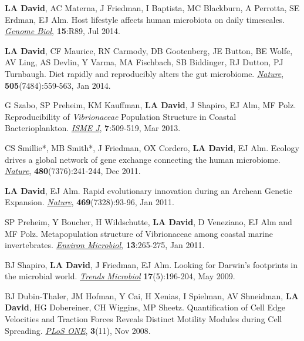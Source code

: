 \documentclass[overlapped,line,11pt]{res}
\begin{document}
\begin{resume}
\begin{revnumerate}[26]
\item {\textbf{LA David}, AC Materna, J Friedman, I Baptista, MC
  Blackburn, A Perrotta, SE Erdman, EJ Alm.  Host lifestyle affects
  human microbiota on daily timescales.
  \emph{\underline{Genome Biol}}, \textbf{15}:R89, Jul 2014.}

\item {\textbf{LA David}, CF Maurice, RN Carmody, DB Gootenberg, JE
  Button, BE Wolfe, AV Ling, AS Devlin, Y Varma, MA Fischbach, SB
  Biddinger, RJ Dutton, PJ Turnbaugh.  Diet rapidly and reproducibly
  alters the gut microbiome. \emph{\underline{Nature}},
  \textbf{505}(7484):559-563, Jan 2014.}

\item {G Szabo, SP Preheim, KM Kauffman, \textbf{LA David}, J Shapiro,
  EJ Alm, MF Polz.  Reproducibility of \emph{Vibrionaceae} Population
  Structure in Coastal Bacterioplankton. \emph{\underline{ISME J}},
  \textbf{7}:509-519, Mar 2013.}

\item {CS Smillie*, MB Smith*, J Friedman, OX Cordero, \textbf{LA
    David}, EJ Alm.  Ecology drives a global network of gene exchange
  connecting the human microbiome. \emph{\underline{Nature}},
  \textbf{480}(7376):241-244, Dec 2011.}

\item {\textbf{LA David}, EJ Alm.  Rapid evolutionary innovation during
  an Archean Genetic Expansion.  \emph{\underline{Nature}},
  \textbf{469}(7328):93-96, Jan 2011.}

\vspace*{1mm}
\item {SP Preheim, Y Boucher, H Wildschutte, \textbf{LA David},
  D Veneziano, EJ Alm and MF Polz.  Metapopulation
  structure of Vibrionaceae among coastal marine
  invertebrates. \emph{\underline{Environ Microbiol}}, \textbf{13}:265-275, Jan 2011.} 

\vspace*{1mm}
\item {BJ Shapiro, \textbf{LA David}, J Friedman, EJ Alm. Looking for
Darwin's footprints in the microbial world.  \emph{\underline{Trends Microbiol}}
\textbf{17}(5):196-204, May 2009.}

\vspace*{1mm}
\item { BJ Dubin-Thaler, JM Hofman, Y Cai, H Xenias, I Spielman, AV
  Shneidman, \textbf{LA David}, HG Dobereiner, CH Wiggins, MP Sheetz.
  Quantification of Cell Edge Velocities and Traction Forces Reveals
  Distinct Motility Modules during Cell Spreading. \emph{\underline{PLoS ONE}},
  \textbf{3}(11), Nov 2008.}


\end{revnumerate}
\end{resume}
\end{document}
